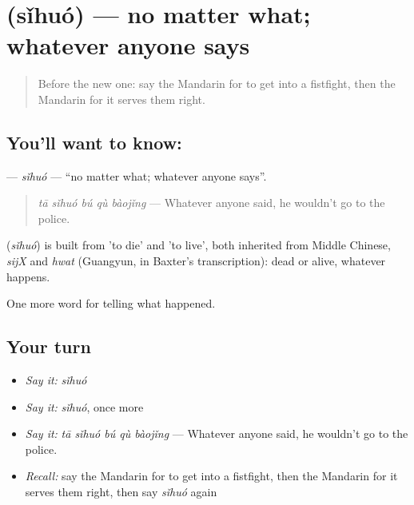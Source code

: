 \section[\texorpdfstring{\zh{死活} (sǐhuó)}{死活 (sǐhuó)}]{ (sǐhuó) — no matter what; whatever anyone says}

\label{lesson:ZH-C312-sihuo}



\begin{quote}
Before the new one: say the Mandarin for to get into a fistfight, then the Mandarin for it serves them right.
\end{quote}

\subsection*{You'll want to know: }
\textbf{} — \emph{sǐhuó} — \textquotedblleft{}no matter what; whatever anyone says\textquotedblright{}.

\begin{quote}
\textbf{} \emph{tā sǐhuó bú qù bàojǐng} — Whatever anyone said, he wouldn't go to the police.
\end{quote}

\begin{cousinweb}
\textbf{} (\emph{sǐhuó}) is built from  'to die' and  'to live', both inherited from Middle Chinese, \emph{sijX} and \emph{hwat} (Guangyun, in Baxter's transcription): dead or alive, whatever happens.
\end{cousinweb}

\begin{grammarlens}[title={What you've built}]
One more word for telling what happened.
\end{grammarlens}

\subsection*{Your turn}
\begin{itemize}
\raggedright
  \item \emph{Say it:} \emph{sǐhuó}
  \item \emph{Say it:} \emph{sǐhuó}, once more
  \item \emph{Say it:} \emph{tā sǐhuó bú qù bàojǐng} — Whatever anyone said, he wouldn't go to the police.
  \item \emph{Recall:} say the Mandarin for to get into a fistfight, then the Mandarin for it serves them right, then say \emph{sǐhuó} again
\end{itemize}

